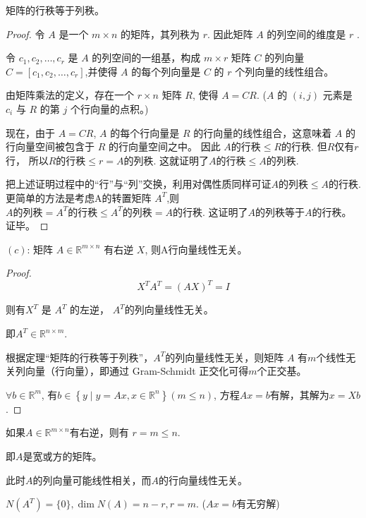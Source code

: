 \begin{theorem}
    矩阵的行秩等于列秩。
\end{theorem}

\begin{proof}
    令 $A$ 是一个 $m\times n$ 的矩阵，其列秩为 $r $. 因此矩阵 $A$ 的列空间的维度是 $r$ . 
    
    令 $c_1,c_2,\ldots,c_r$ 是 $A$ 的列空间的一组基，构成 $m \times r$ 矩阵 $C$ 的列向量 $C = [c_1,c_2,\ldots,c_r]$,并使得 $A$ 的每个列向量是 $C$ 的 $r$ 个列向量的线性组合。 
    
    由矩阵乘法的定义，存在一个 $r \times n$ 矩阵 $R$, 使得 $A = CR$. ($A$ 的 $(i,j)$ 元素是 $c_i$ 与 $R$ 的第 $j$ 个行向量的点积。)

现在，由于 $A = CR$, $A$ 的每个行向量是 $R$ 的行向量的线性组合，这意味着 $A$ 的行向量空间被包含于 $R$ 的行向量空间之中。 因此 $A 的行秩 \leq R的行秩$. 但$R$仅有$r$行， 所以$R的行秩 \leq r = A的列秩$. 这就证明了$A的行秩 \leq A的列秩$.

把上述证明过程中的“行”与“列”交换，利用对偶性质同样可证$A的列秩 \leq A的行秩$. 更简单的方法是考虑A的转置矩阵 $A^ {T}$,则$A的列秩 =  A^ {T}的行秩 \leq  A^ {T}的列秩 = A的行秩$. 这证明了$A$的列秩等于$A$的行秩。 证毕。
\end{proof}

\begin{theorem}
    $(c)$: 矩阵 $ A \in \mathbb{R}^{m \times n} $ 有右逆 $ X $, 则A行向量线性无关。
\end{theorem}

\begin{proof}
    \begin{equation}  {X}^{T} A^{T}=(A X)^{T}=I \end{equation}
    
    则有$  {X}^{T} $ 是 $ A^{T} $ 的左逆， $ A^{T} $的列向量线性无关。  

    即$ A^{T} \in \mathbb{R}^{n \times m} $.
    
    根据定理“矩阵的行秩等于列秩”，$ A^{T} $的列向量线性无关，则矩阵 $ A $ 有$m$个线性无关列向量（行向量），即通过 Gram-Schmidt 正交化可得$m$个正交基。 

    $ \forall b \in \mathbb{R}^{m} $, 有$ b \in\left\{y \mid y=A x, x \in \mathbb{R}^{n}\right\} (m \leq n ) $, 方程$ A x=b $有解，其解为$ x=X b $. 
\end{proof}

\begin{corollary}
    如果$ A \in \mathbb{R}^{m \times n} $有右逆，则有 $r= m \leq n  $. 

   即$A$是宽或方的矩阵。 

   此时$A$的列向量可能线性相关，而$A$的行向量线性无关。 
   
   $N(A^T) = \{0\}, \operatorname{dim} N(A) = n-r, r=m$. ($Ax=b$有无穷解) 
   \end{corollary}

